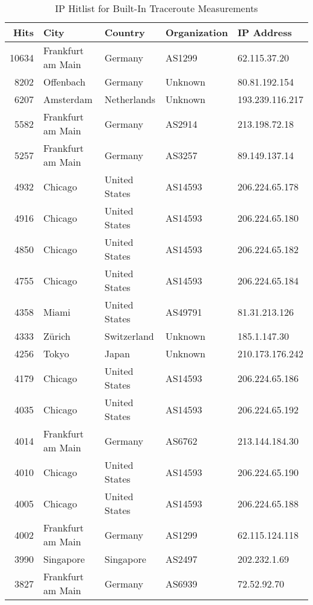 \begin{table}
	\caption{IP Hitlist for Built-In Traceroute Measurements}
	\label{fig:ip-hitlist-traceroute}
	\begin{tabular}{rllll}
		\toprule
		Hits  & City              & Country       & Organization & IP Address      \\
		\midrule
		10634 & Frankfurt am Main & Germany       & AS1299       & 62.115.37.20    \\
		8202  & Offenbach         & Germany       & Unknown      & 80.81.192.154   \\
		6207  & Amsterdam         & Netherlands   & Unknown      & 193.239.116.217 \\
		5582  & Frankfurt am Main & Germany       & AS2914       & 213.198.72.18   \\
		5257  & Frankfurt am Main & Germany       & AS3257       & 89.149.137.14   \\
		4932  & Chicago           & United States & AS14593      & 206.224.65.178  \\
		4916  & Chicago           & United States & AS14593      & 206.224.65.180  \\
		4850  & Chicago           & United States & AS14593      & 206.224.65.182  \\
		4755  & Chicago           & United States & AS14593      & 206.224.65.184  \\
		4358  & Miami             & United States & AS49791      & 81.31.213.126   \\
		4333  & Zürich            & Switzerland   & Unknown      & 185.1.147.30    \\
		4256  & Tokyo             & Japan         & Unknown      & 210.173.176.242 \\
		4179  & Chicago           & United States & AS14593      & 206.224.65.186  \\
		4035  & Chicago           & United States & AS14593      & 206.224.65.192  \\
		4014  & Frankfurt am Main & Germany       & AS6762       & 213.144.184.30  \\
		4010  & Chicago           & United States & AS14593      & 206.224.65.190  \\
		4005  & Chicago           & United States & AS14593      & 206.224.65.188  \\
		4002  & Frankfurt am Main & Germany       & AS1299       & 62.115.124.118  \\
		3990  & Singapore         & Singapore     & AS2497       & 202.232.1.69    \\
		3827  & Frankfurt am Main & Germany       & AS6939       & 72.52.92.70     \\
		\bottomrule
	\end{tabular}
\end{table}
